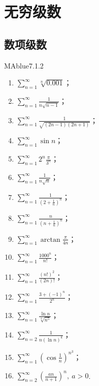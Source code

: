 \chapter{无穷级数}

\section{数项级数}

\begin{problem}{MAblue}{7.1.2}
    \begin{multicols}{2}
        \begin{enumerate}[label={(\arabic*)}]
            \item $\displaystyle \sum_{n=1}^\infty \sqrt[n]{0.001}$；
            \item $\displaystyle \sum_{n=1}^\infty \frac 1 {n\sqrt{n-1}}$；
            \item $\displaystyle \sum_{n=1}^\infty \frac 1 {\sqrt{(2n-1)(2n+1)}}$；
            \item $\displaystyle \sum_{n=1}^\infty \sin n$；
            \item $\displaystyle \sum_{n=1}^\infty 2^n \frac \pi {3^n}$；
            \item $\displaystyle \sum_{n=1}^\infty \frac 1 {n\sqrt n}$；
            \item $\displaystyle \sum_{n=1}^\infty \frac 1 {\left( 2 + \frac 1 n \right)^n}$；
            \item $\displaystyle \sum_{n=1}^\infty \frac n {\left( n + \frac 1 n \right)^n}$；
            \item $\displaystyle \sum_{n=1}^\infty \arctan \frac \pi {4n}$；
            \item $\displaystyle \sum_{n=1}^\infty \frac{1000^n}{n!}$；
            \item $\displaystyle \sum_{n=1}^\infty \frac{(n!)^2}{(2n)!}$；
            \item $\displaystyle \sum_{n=1}^\infty \frac{3+(-1)^n}{2^n}$；
            \item $\displaystyle \sum_{n=1}^\infty \frac{\ln n}{\sqrt[4]{n^5}}$；
            \item $\displaystyle \sum_{n=2}^\infty \frac 1 {n(\ln n)^k}$；
            \item $\displaystyle \sum_{n=1}^\infty \left( \cos \frac 1 n \right)^{n^3}$；
            \item $\displaystyle \sum_{n=2}^\infty \left( \frac{an}{n+1} \right)^n,\ a > 0$.
        \end{enumerate}
    \end{multicols}
\end{problem}

